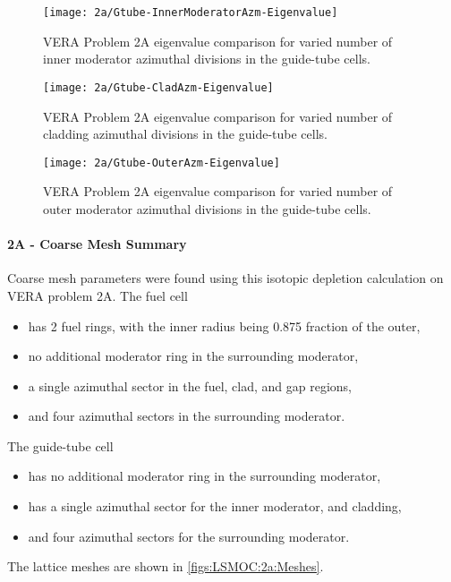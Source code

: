 {{{{{          \begin{figure}
            \centering
            \texttt{[image: 2a/Gtube-InnerModeratorAzm-Eigenvalue]}
            \caption{VERA Problem 2A eigenvalue comparison for varied number of inner moderator azimuthal divisions in the guide-tube cells. \label{fig:LSMOC:2A:Gtube:Inner Moderator Azimuthals:Eigenvalues}}
          \end{figure}
          \begin{figure}
            \centering
            \texttt{[image: 2a/Gtube-CladAzm-Eigenvalue]}
            \caption{VERA Problem 2A eigenvalue comparison for varied number of cladding azimuthal divisions in the guide-tube cells. \label{fig:LSMOC:2A:Gtube:Cladding Azimuthals:Eigenvalues}}
          \end{figure}
          \begin{figure}
            \centering
            \texttt{[image: 2a/Gtube-OuterAzm-Eigenvalue]}
            \caption{VERA Problem 2A eigenvalue comparison for varied number of outer moderator azimuthal divisions in the guide-tube cells. \label{fig:LSMOC:2A:Gtube:Outer Moderator Azimuthals:Eigenvalues}}
          \end{figure}
        }
        \paragraph{2A - Coarse Mesh Summary}{
          Coarse mesh parameters were found using this isotopic depletion calculation on \ac{VERA} problem 2A.
          The fuel cell
          \begin{itemize}
            \item{has 2 fuel rings, with the inner radius being 0.875 fraction of the outer,}
            \item{no additional moderator ring in the surrounding moderator,}
            \item{a single azimuthal sector in the fuel, clad, and gap regions,}
            \item{and four azimuthal sectors in the surrounding moderator.}
          \end{itemize}
          The guide-tube cell
          \begin{itemize}
            \item{has no additional moderator ring in the surrounding moderator,}
            \item{has a single azimuthal sector for the inner moderator, and cladding,}
            \item{and four azimuthal sectors for the surrounding moderator.}
          \end{itemize}
          The lattice meshes are shown in \cref{figs:LSMOC:2a:Meshes}.

}}}}}
